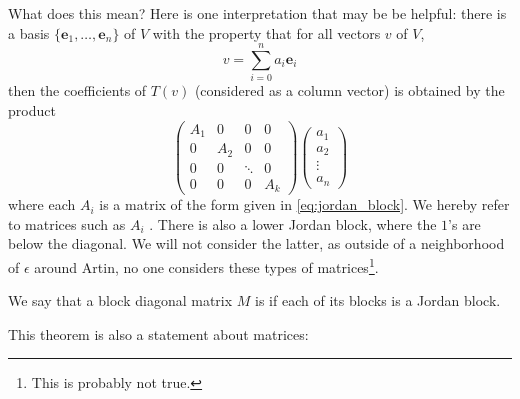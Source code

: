 What does this mean? Here is one interpretation that may be
be helpful: there is a basis $\{\mathbf{e}_1,\dots,\mathbf{e}_n\}$ 
of $V$ with the property that for all vectors $v$ of $V$,
\[
v = \sum_{i = 0}^n a_i \mathbf{e}_i
\]
then the coefficients of $T(v)$ (considered as a column vector) 
is obtained by the product
\[
\left(
\begin{matrix}
A_1 &0   & 0     &0 \\
0   &A_2 & 0     &0 \\
0   &0   &\ddots &0 \\
0   &0   &0      &A_k
\end{matrix}
\right)
\left(
\begin{matrix}
a_1\\
a_2\\
\vdots\\
a_n
\end{matrix}
\right)
\]
where each $A_i$ is a matrix of the form given in 
\eqref{eq:jordan_block}. We hereby refer to matrices such as $A_i$
. There is also a lower Jordan block,
where the $1$'s are below the diagonal. We will not consider the
latter, as outside of a neighborhood of $\epsilon$ around Artin,
no one considers these types of matrices\footnote{This is probably 
not true.}.

We say that a block diagonal matrix $M$ is  if each of its blocks is a Jordan block.

This theorem is also a statement about matrices:


